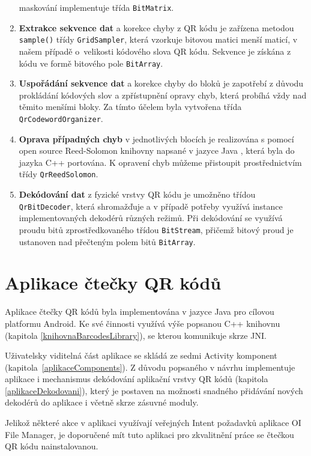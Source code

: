 \begin{enumerate}
  maskování implementuje třída \texttt{BitMatrix}.
  \item \textbf{Extrakce sekvence dat} a korekce chyby z QR kódu je zařízena
  metodou \texttt{sample()} třídy \texttt{GridSampler}, která
  vzorkuje bitovou matici menší maticí, v našem případě o~velikosti kódového
  slova QR kódu.
  Sekvence je získána z kódu ve formě bitového pole \texttt{BitArray}.
  \item \textbf{Uspořádání sekvence dat} a korekce chyby do bloků je zapotřebí z
  důvodu prokládání kódových slov a zpřístupnění opravy chyb, která probíhá vždy
  nad těmito menšími bloky. Za tímto účelem byla vytvořena třída
  \texttt{QrCodewordOrganizer}.
  \item \textbf{Oprava případných chyb} v jednotlivých blocích je realizována s
  pomocí open source Reed-Solomon knihovny napsané v jazyce Java
  \cite{reedSolomonProject}, která byla do jazyka C++ portována. K opravení chyb můžeme přistoupit prostřednictvím
  třídy \texttt{QrReedSolomon}.
  \item \textbf{Dekódování dat} z fyzické vrstvy QR kódu je umožněno třídou
  \texttt{QrBitDecoder}, která shromažďuje a v případě potřeby využívá instance
  implementovaných dekodérů různých režimů. Při dekódování se využívá proudu
  bitů zprostředkovaného třídou \texttt{BitStream}, přičemž bitový proud je
  ustanoven nad přečteným polem bitů \texttt{BitArray}.
\end{enumerate}

\clearpage
\section{Aplikace čtečky QR kódů}
\label{aplikaceCteckyImplementace}

Aplikace čtečky QR kódů byla implementována v jazyce Java pro cílovou platformu
Android. Ke své činnosti využívá výše popsanou C++ knihovnu (kapitola
\ref{knihovnaBarcodesLibrary}), se kterou komunikuje skrze JNI.

Uživatelsky viditelná část aplikace se skládá ze sedmi Activity komponent
(kapitola~\ref{aplikaceComponents}). Z důvodu popsaného v návrhu implementuje
aplikace i mechanismus dekódování aplikační vrstvy QR kódů (kapitola
\ref{aplikaceDekodovani}), který je postaven na možnosti snadného přidávání
nových dekodérů do aplikace i včetně skrze zásuvné moduly.

Jelikož některé akce v aplikaci využívají veřejných Intent požadavků aplikace
OI File Manager, je doporučené mít tuto aplikaci pro zkvalitnění práce se
čtečkou QR kódu nainstalovanou.

